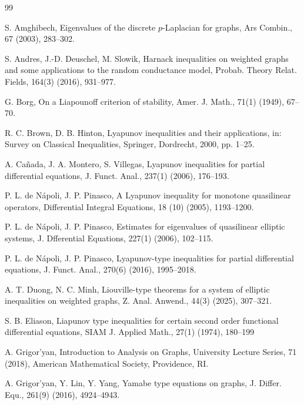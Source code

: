 \documentclass[twoside,12pt,letter]{article}
\theoremstyle{plain}
\theoremstyle{definition}
\theoremstyle{remark}
\numberwithin{equation}{section}
\begin{document}
\begin{thebibliography}{99}

S. Amghibech,
Eigenvalues of the discrete \(p\)-Laplacian for graphs,
Ars Combin.,
67 (2003), 283--302.

S. Andres, J.-D. Deuschel, M. Slowik,
Harnack inequalities on weighted graphs and some applications to the random
conductance model,
Probab. Theory Relat. Fields,
164(3) (2016), 931--977.


G. Borg, 
On a Liapounoff criterion of stability, 
Amer. J. Math.,  
71(1) (1949), 67--70.


R. C. Brown, D. B. Hinton,
Lyapunov inequalities and their applications, 
in: Survey on Classical Inequalities, Springer, Dordrecht, 2000, pp. 1--25.


A. Ca\~nada, J. A. Montero, S. Villegas, 
Lyapunov inequalities for partial differential equations,
J. Funct. Anal., 
237(1) (2006),  176--193.




P. L. de N\'apoli, J. P. Pinasco,
A Lyapunov inequality for monotone quasilinear operators, 
Differential Integral Equations, 
18 (10) (2005),  1193--1200.


P. L. de N\'apoli, J. P. Pinasco,
Estimates for eigenvalues of quasilinear elliptic systems, 
J. Dfferential Equations,
227(1) (2006), 102--115.


P. L. de N\'apoli, J. P. Pinasco,
Lyapunov-type inequalities for partial differential equations,
J. Funct. Anal.,
270(6) (2016), 1995--2018.


A. T. Duong, N. C. Minh,
Liouville-type theorems for a system of elliptic inequalities on weighted graphs,
Z. Anal. Anwend.,
44(3) (2025), 307--321.


S. B. Eliason, 
Liapunov type inequalities for certain second order functional differential
equations,
SIAM J. Applied Math.,
 27(1) (1974), 180--199 


A. Grigor'yan,
Introduction to Analysis on Graphs,
University Lecture Series,
71 (2018), American Mathematical Society, Providence, RI.

A. Grigor'yan, Y. Lin,  Y. Yang,  
Yamabe type equations on graphs,
J. Differ. Equ.,
261(9) (2016), 4924--4943.



\end{thebibliography}
\end{document}
